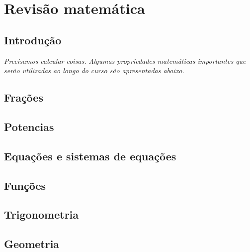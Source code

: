 \chapter{Revisão matemática}
\label{Chap:Review}



\section{Introdução}

{\it
Precisamos calcular coisas. Algumas propriedades matemáticas importantes que serão utilizadas ao longo do curso são apresentadas abaixo.
}

\section{Frações}

\section{Potencias}

\section{Equações e sistemas de equações}

\section{Funções}

\section{Trigonometria}


\section{Geometria}

